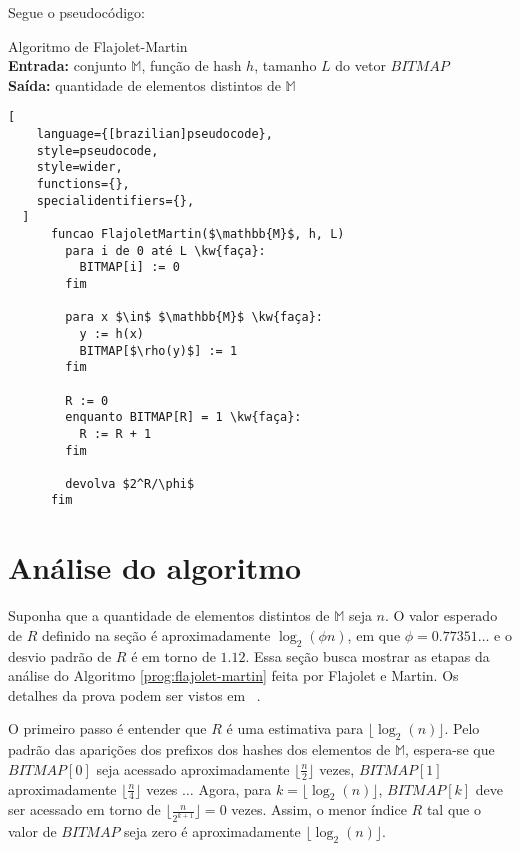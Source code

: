 Segue o pseudocódigo:
\begin{programruledcaption}{
Algoritmo de Flajolet-Martin 
\\ \textbf{Entrada:} conjunto $\mathbb{M}$, função de hash $h$, tamanho $L$ do vetor $BITMAP$ 
\\ \textbf{Saída:} quantidade de elementos distintos de $\mathbb{M}$
\label{prog:flajolet-martin}
}
  \begin{lstlisting}[
    language={[brazilian]pseudocode},
    style=pseudocode,
    style=wider,
    functions={},
    specialidentifiers={},
  ]
      funcao FlajoletMartin($\mathbb{M}$, h, L)
        para i de 0 até L \kw{faça}:
          BITMAP[i] := 0
        fim

        para x $\in$ $\mathbb{M}$ \kw{faça}:
          y := h(x)
          BITMAP[$\rho(y)$] := 1
        fim

        R := 0
        enquanto BITMAP[R] = 1 \kw{faça}:
          R := R + 1
        fim

        devolva $2^R/\phi$
      fim
  \end{lstlisting}
\end{programruledcaption}

\section{Análise do algoritmo}
\label{sec:flajolet-martin:analysis}

Suponha que a quantidade de elementos distintos de $\mathbb{M}$ seja $n$. 
O valor esperado de $R$ definido na seção  é aproximadamente $\log_2(\phi n)$,
em que $\phi = 0.77351\dots$ e o desvio padrão de $R$ é em torno de $1.12$. 
Essa seção busca mostrar as etapas da análise do Algoritmo \ref{prog:flajolet-martin} feita por Flajolet e Martin.
Os detalhes da prova podem ser vistos em ~\citep{flajolet:martin:85}.

O primeiro passo é entender que $R$ é uma estimativa para $\lfloor \log_2(n) \rfloor$.
Pelo padrão das aparições dos prefixos dos hashes dos elementos de $\mathbb{M}$, 
espera-se que $BITMAP[0]$ seja acessado aproximadamente $\lfloor \frac{n}{2} \rfloor$ vezes, 
$BITMAP[1]$ aproximadamente $\lfloor \frac{n}{4} \rfloor$ vezes $\dots$
Agora, para $k = \lfloor \log_2(n) \rfloor$, $BITMAP[k]$ deve ser acessado em torno de 
$\lfloor \frac{n}{2^{k+1}} \rfloor = 0$ vezes. Assim, o menor índice $R$ tal que o valor de $BITMAP$ seja zero
é aproximadamente $\lfloor \log_2(n) \rfloor$.

